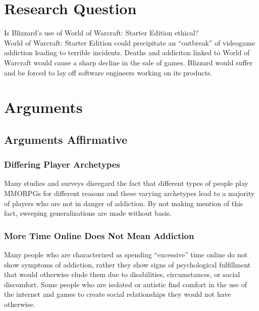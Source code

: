 \documentclass[11pt]{article}
\begin{document}
\begin{multicols}{2}
\section{Research Question}
Is Blizzard's use of World of Warcraft: Starter Edition ethical? \\
World of Warcraft: Starter Edition could precipitate an ``outbreak'' of videogame addiction leading to terrible incidents. \cite{SnowlyDeath} Deaths and addiciton linked to World of Warcraft would cause a sharp decline in the sale of games. Blizzard would suffer and be forced to lay off software engineers working on its products.



\section{Arguments}
\subsection{Arguments Affirmative}
\subsubsection{Differing Player Archetypes}
Many studies and surveys disregard the fact that different types of people play MMORPGs for different reasons and these varying archetypes lead to a majority of players who are not in danger of addiction. By not making mention of this fact, sweeping generalizations are made without basis. \cite{PlayerMotivations}
\subsubsection{More Time Online Does Not Mean Addiction}
Many people who are characterized as spending ``excessive'' time online do not show symptoms of addiction, rather they show signs of psychological fulfillment that would otherwise elude them due to disabilities, circumstances, or social discomfort. Some people who are isolated or autistic find comfort in the use of the internet and games to create social relationships they would not have otherwise. \cite{IsThereEvidenceOfInternetAddiction}

\end{multicols}
\end{document}
